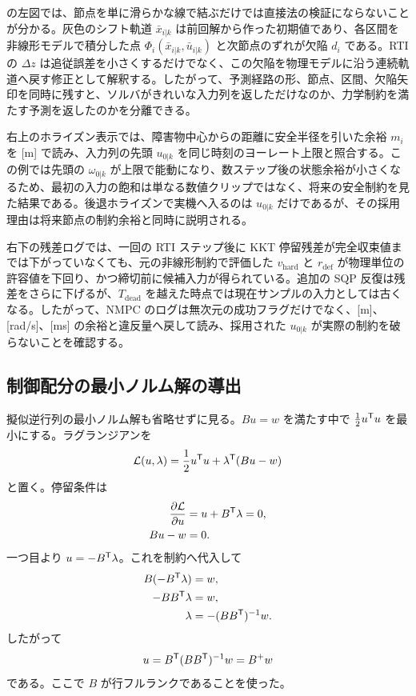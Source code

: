  の左図では、節点を単に滑らかな線で結ぶだけでは直接法の検証にならないことが分かる。灰色のシフト軌道 $\bar{x}_{i|k}$ は前回解から作った初期値であり、各区間を非線形モデルで積分した点 $\Phi_i(\bar{x}_{i|k},\bar{u}_{i|k})$ と次節点のずれが欠陥 $d_i$ である。RTI の $\Delta z$ は追従誤差を小さくするだけでなく、この欠陥を物理モデルに沿う連続軌道へ戻す修正として解釈する。したがって、予測経路の形、節点、区間、欠陥矢印を同時に残すと、ソルバがきれいな入力列を返しただけなのか、力学制約を満たす予測を返したのかを分離できる。

右上のホライズン表示では、障害物中心からの距離に安全半径を引いた余裕 $m_i$ を [m] で読み、入力列の先頭 $u_{0|k}$ を同じ時刻のヨーレート上限と照合する。この例では先頭の $\omega_{0|k}$ が上限で能動になり、数ステップ後の状態余裕が小さくなるため、最初の入力の飽和は単なる数値クリップではなく、将来の安全制約を見た結果である。後退ホライズンで実機へ入るのは $u_{0|k}$ だけであるが、その採用理由は将来節点の制約余裕と同時に説明される。

右下の残差ログでは、一回の RTI ステップ後に KKT 停留残差が完全収束値までは下がっていなくても、元の非線形制約で評価した $v_{\mathrm{hard}}$ と $r_{\mathrm{def}}$ が物理単位の許容値を下回り、かつ締切前に候補入力が得られている。追加の SQP 反復は残差をさらに下げるが、$T_{\mathrm{dead}}$ を越えた時点では現在サンプルの入力としては古くなる。したがって、NMPC のログは無次元の成功フラグだけでなく、[m]、[rad/s]、[ms] の余裕と違反量へ戻して読み、採用された $u_{0|k}$ が実際の制約を破らないことを確認する。

\subsection{制御配分の最小ノルム解の導出}

\begin{derivation}
擬似逆行列の最小ノルム解も省略せずに見る。$Bu=w$ を満たす中で $\frac{1}{2}u^{\mathsf{T}} u$ を最小にする。ラグランジアンを
\begin{equation}
  \mathcal{L}(u,\lambda)=\frac{1}{2}u^{\mathsf{T}} u+\lambda^{\mathsf{T}}(Bu-w)
\end{equation}
と置く。停留条件は
\begin{align}
  \frac{\partial\mathcal{L}}{\partial u}&=u+B^{\mathsf{T}}\lambda=0,\\
  Bu-w&=0.
\end{align}
一つ目より $u=-B^{\mathsf{T}}\lambda$。これを制約へ代入して
\begin{align}
  B(-B^{\mathsf{T}}\lambda)&=w,\\
  -BB^{\mathsf{T}}\lambda&=w,\\
  \lambda&=-(BB^{\mathsf{T}})^{-1}w.
\end{align}
したがって
\begin{equation}
  u=B^{\mathsf{T}}(BB^{\mathsf{T}})^{-1}w=B^+w
\end{equation}
である。ここで $B$ が行フルランクであることを使った。
\end{derivation}

